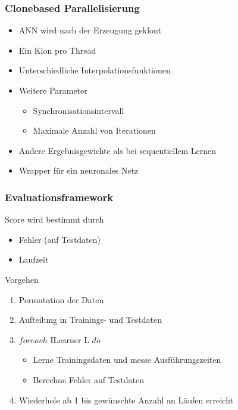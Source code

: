 \documentclass[18pt]{beamer}
\begin{document}
	\begin{frame}[t]\frametitle{Clonebased Parallelisierung}
		\begin{itemize}
			\item ANN wird nach der Erzeugung \glqq geklont\grqq
			\item Ein Klon pro Thread
			\item Unterschiedliche Interpolationsfunktionen
			\item Weitere Parameter
			\begin{itemize}
				\item Synchronisationsintervall
				\item Maximale Anzahl von Iterationen
			\end{itemize}				
			\item Andere Ergebnisgewichte als bei sequentiellem Lernen
			\item Wrapper für ein neuronales Netz
		\end{itemize}
	\end{frame}





	\begin{frame}[c]\frametitle{Evaluationsframework}
		\begin{block}{Score}
			wird bestimmt durch
		    \begin{itemize}
		    	\item Fehler (auf Testdaten)
		    	\item Laufzeit
		    \end{itemize}
		\end{block}
		\begin{block}{Vorgehen}
		    \begin{enumerate}
		    	\item Permutation der Daten
		    	\item Aufteilung in Trainings- und Testdaten
				\item $foreach$ ILearner L $do$
				\begin{itemize}
					\item Lerne Trainingsdaten und messe Ausführungszeiten
					\item Berechne Fehler auf Testdaten
				\end{itemize}
				\item Wiederhole ab 1 bis gewünschte Anzahl an Läufen erreicht
		    \end{enumerate}
		\end{block}
	\end{frame}
	
\end{document}

